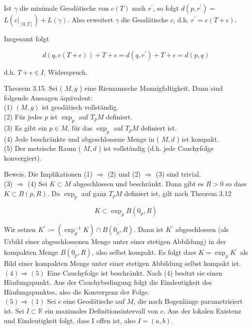 \documentclass[10pt]{article}
\begin{document}
Ist $\gamma$ die minimale Geodätische von $c(T)$ nach $r^{\prime}$, so folgt $d\left(p, r^{\prime}\right)=$ $L\left(\left.c\right|_{[0, T]}\right)+L(\gamma)$. Also erweitert $\gamma$ die Geodätische $c$, d.h. $r^{\prime}=c(T+\epsilon)$.

Insgesamt folgt

$$
d(q, c(T+\epsilon))+T+\epsilon=d\left(q, r^{\prime}\right)+T+\epsilon=d(p, q)
$$

d.h. $T+\epsilon \in I$, Widerspruch.

Theorem 3.15. Sei ( $M, g$ ) eine Riemannsche Mannigfaltigkeit. Dann sind folgende Aussagen äquivalent:\\
(1) $(M, g)$ ist geodätisch vollständig.\\
(2) Für jedes $p$ ist $\exp _{p}$ auf $T_{p} M$ definiert.\\
(3) Es gibt ein $p \in M$, für das $\exp _{p}$ auf $T_{p} M$ definiert ist.\\
(4) Jede beschränkte und abgeschlossene Menge in ( $M, d$ ) ist kompakt.\\
(5) Der metrische Raum ( $M, d$ ) ist vollständig (d.h. jede Cauchyfolge konvergiert).

Beweis. Die Implikationen (1) $\Longrightarrow$ (2) und (2) $\Longrightarrow$ (3) sind trivial.\\
(3) $\Longrightarrow$ (4) Sei $K \subset M$ abgeschlossen und beschränkt. Dann gibt es $R>0$ so dass $K \subset B(p, R)$. Da $\exp _{p}$ auf ganz $T_{p} M$ definiert ist, gilt nach Theorem 3.12

$$
K \subset \exp _{p} B\left(0_{p}, R\right)
$$

Wir setzen $K^{\prime}:=\left(\exp _{p}^{-1} K\right) \cap \overline{B\left(0_{p}, R\right)}$. Dann ist $K^{\prime}$ abgeschlossen (als Urbild einer abgeschlossenen Menge unter einer stetigen Abbildung) in der kompakten Menge $\overline{B\left(0_{p}, R\right)}$, also selbst kompakt. Es folgt dass $K=\exp _{p} K^{\prime}$ als Bild einer kompakten Menge unter einer stetigen Abbildung selbst kompakt ist.\\
$(4) \Longrightarrow(5)$ Eine Cauchyfolge ist beschränkt. Nach (4) besitzt sie einen Häufungspunkt. Aus der Cauchybedingung folgt die Eindeutigkeit des Häufungspunktes, also die Konvergenz der Folge.\\
$(5) \Longrightarrow(1)$ Sei $c$ eine Geodätische auf $M$, die nach Bogenlänge parametrisiert ist. Sei $I \subset \mathbb{R}$ ein maximales Definitionsintervall von $c$. Aus der lokalen Existenz und Eindeutigkeit folgt, dass I offen ist, also $I=(a, b)$.
\end{document}
